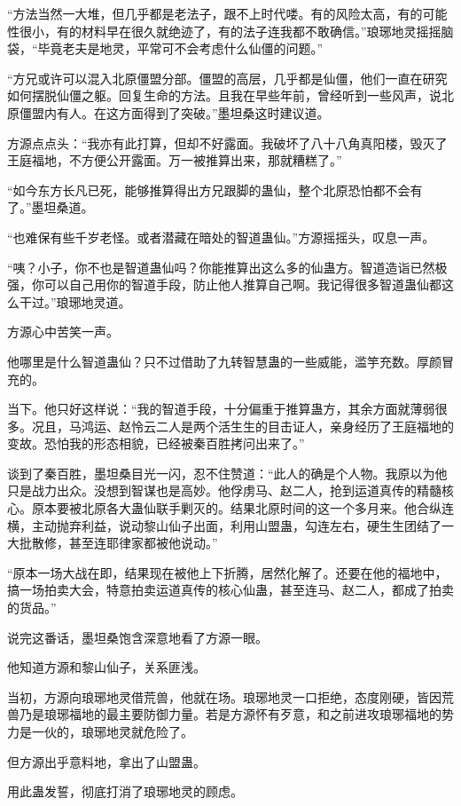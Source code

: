 \begin{this_body}
“方法当然一大堆，但几乎都是老法子，跟不上时代喽。有的风险太高，有的可能性很小，有的材料早在很久就绝迹了，有的法子连我都不敢确信。”琅琊地灵摇摇脑袋，“毕竟老夫是地灵，平常可不会考虑什么仙僵的问题。”

“方兄或许可以混入北原僵盟分部。僵盟的高层，几乎都是仙僵，他们一直在研究如何摆脱仙僵之躯。回复生命的方法。且我在早些年前，曾经听到一些风声，说北原僵盟内有人。在这方面得到了突破。”墨坦桑这时建议道。

方源点点头：“我亦有此打算，但却不好露面。我破坏了八十八角真阳楼，毁灭了王庭福地，不方便公开露面。万一被推算出来，那就糟糕了。”

“如今东方长凡已死，能够推算得出方兄跟脚的蛊仙，整个北原恐怕都不会有了。”墨坦桑道。

“也难保有些千岁老怪。或者潜藏在暗处的智道蛊仙。”方源摇摇头，叹息一声。

“咦？小子，你不也是智道蛊仙吗？你能推算出这么多的仙蛊方。智道造诣已然极强，你可以自己用你的智道手段，防止他人推算自己啊。我记得很多智道蛊仙都这么干过。”琅琊地灵道。

方源心中苦笑一声。

他哪里是什么智道蛊仙？只不过借助了九转智慧蛊的一些威能，滥竽充数。厚颜冒充的。

当下。他只好这样说：“我的智道手段，十分偏重于推算蛊方，其余方面就薄弱很多。况且，马鸿运、赵怜云二人是两个活生生的目击证人，亲身经历了王庭福地的变故。恐怕我的形态相貌，已经被秦百胜拷问出来了。”

谈到了秦百胜，墨坦桑目光一闪，忍不住赞道：“此人的确是个人物。我原以为他只是战力出众。没想到智谋也是高妙。他俘虏马、赵二人，抢到运道真传的精髓核心。原本要被北原各大蛊仙联手剿灭的。结果北原时间的这一个多月来。他合纵连横，主动抛弃利益，说动黎山仙子出面，利用山盟蛊，勾连左右，硬生生团结了一大批散修，甚至连耶律家都被他说动。”

“原本一场大战在即，结果现在被他上下折腾，居然化解了。还要在他的福地中，搞一场拍卖大会，特意拍卖运道真传的核心仙蛊，甚至连马、赵二人，都成了拍卖的货品。”

说完这番话，墨坦桑饱含深意地看了方源一眼。

他知道方源和黎山仙子，关系匪浅。

当初，方源向琅琊地灵借荒兽，他就在场。琅琊地灵一口拒绝，态度刚硬，皆因荒兽乃是琅琊福地的最主要防御力量。若是方源怀有歹意，和之前进攻琅琊福地的势力是一伙的，琅琊地灵就危险了。

但方源出乎意料地，拿出了山盟蛊。

用此蛊发誓，彻底打消了琅琊地灵的顾虑。


\end{this_body}
